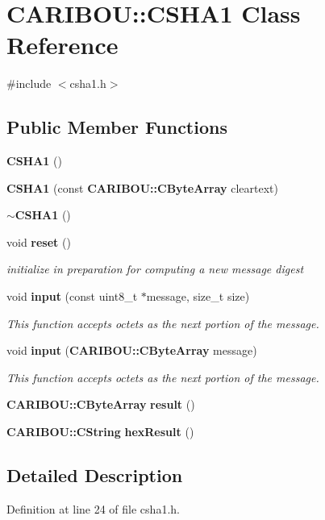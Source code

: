 \section{C\+A\+R\+I\+B\+OU\+:\+:C\+S\+H\+A1 Class Reference}
\label{class_c_a_r_i_b_o_u_1_1_c_s_h_a1}


{\ttfamily \#include $<$csha1.\+h$>$}

\subsection*{Public Member Functions}
\begin{DoxyCompactItemize}
\item 
{\bf C\+S\+H\+A1} ()
\item 
{\bf C\+S\+H\+A1} (const {\bf C\+A\+R\+I\+B\+O\+U\+::\+C\+Byte\+Array} cleartext)
\item 
{\bf $\sim$\+C\+S\+H\+A1} ()
\item 
void {\bf reset} ()
\begin{DoxyCompactList}\small\item\em initialize in preparation for computing a new message digest \end{DoxyCompactList}\item 
void {\bf input} (const uint8\+\_\+t $\ast$message, size\+\_\+t size)
\begin{DoxyCompactList}\small\item\em This function accepts octets as the next portion of the message. \end{DoxyCompactList}\item 
void {\bf input} ({\bf C\+A\+R\+I\+B\+O\+U\+::\+C\+Byte\+Array} message)
\begin{DoxyCompactList}\small\item\em This function accepts octets as the next portion of the message. \end{DoxyCompactList}\item 
{\bf C\+A\+R\+I\+B\+O\+U\+::\+C\+Byte\+Array} {\bf result} ()
\item 
{\bf C\+A\+R\+I\+B\+O\+U\+::\+C\+String} {\bf hex\+Result} ()
\end{DoxyCompactItemize}


\subsection{Detailed Description}


Definition at line 24 of file csha1.\+h.



